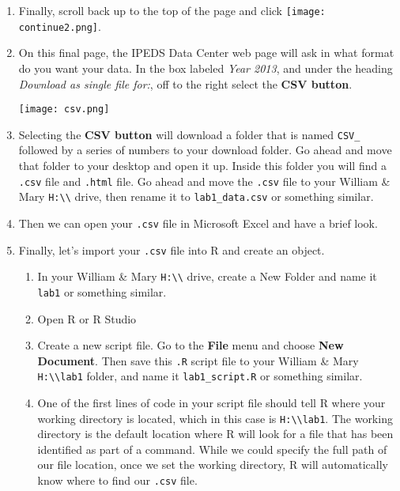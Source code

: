 \documentclass{article}
\newcommand{\code}[1]{\texttt{#1}}
\newcommand{\proglang}[1]{\textsf{#1}}
\begin{document}
{\begin{enumerate}[leftmargin=15mm]
\item Finally, scroll back up to the top of the page and click \texttt{[image: continue2.png]}.

\item On this final page, the IPEDS Data Center web page will ask in what format do you want your data.  In the box labeled \textit{Year 2013}, and under the heading \textit{Download as single file for:}, off to the right select the \textbf{CSV button}.\begin{flushright}\texttt{[image: csv.png]}\end{flushright}

\item Selecting the \textbf{CSV button} will download a folder that is named \texttt{CSV\_} followed by a series of numbers to your download folder.  Go ahead and move that folder to your desktop and open it up.  Inside this folder you will find a \code{.csv} file and \code{.html} file.  Go ahead and move the \code{.csv} file to your William \& Mary \code{H:\textbackslash\textbackslash} drive, then rename it to \texttt{lab1\_data.csv} or something similar.

\item Then we can open your \code{.csv} file in Microsoft Excel and have a brief look.

\item Finally, let's import your \code{.csv} file into \proglang{R} and create an object.

\begin{enumerate}[label=\Alph*.  ]

\item In your William \& Mary \code{H:\textbackslash\textbackslash} drive, create a New Folder and name it \code{lab1} or something similar.

\item Open \proglang{R} or R Studio

\item Create a new script file.  Go to the \textbf{File} menu and choose \textbf{New Document}.  Then save this \code{.R} script file to your William \& Mary \code{H:\textbackslash\textbackslash}\code{lab1} folder, and name it \texttt{lab1\_script.R} or something similar.

\item One of the first lines of code in your script file should tell \proglang{R} where your working directory is located, which in this case is \code{H:\textbackslash\textbackslash}\code{lab1}.  The working directory is the default location where \proglang{R} will look for a file that has been identified as part of a command.  While we could specify the full path of our file location, once we set the working directory, \proglang{R} will automatically know where to find our \code{.csv} file.


\end{enumerate}
\end{enumerate}}
\end{document}
